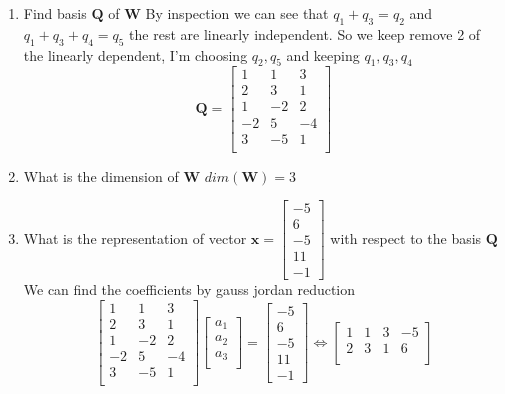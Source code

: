 \documentclass{article}
\begin{document}
\begin{enumerate}[1.]
\item Find basis $\mathbf{Q}$ of $\mathbf{W}$
\newline
By inspection we can see that $q_1 + q_3 = q_2$ and $q_1 + q_3 + q_4 = q_5 $ the rest are linearly independent.
So we keep remove 2 of the linearly dependent, I'm choosing $q_2, q_5$ and keeping $q_1,q_3,q_4$
$$
\mathbf{Q}
=
\begin{bmatrix}
1  & 1  & 3  \\
2  & 3  & 1  \\
1  & -2 & 2  \\
-2 & 5  & -4 \\
3  & -5 & 1  \\
\end{bmatrix}
$$
\item What is the dimension of $\mathbf{W}$
\newline
$dim(\mathbf{W}) = 3$
\item What is the representation of vector $\mathbf{x} = \begin{bmatrix}-5 \\ 6 \\ -5 \\ 11 \\ -1 \end{bmatrix}$ with respect to the basis $\mathbf{Q}$
\newline
We can find the coefficients by gauss jordan reduction
$$
\begin{bmatrix}
1  & 1  & 3  \\
2  & 3  & 1  \\
1  & -2 & 2  \\
-2 & 5  & -4 \\
3  & -5 & 1  \\
\end{bmatrix}
\begin{bmatrix}
a_1 \\
a_2 \\
a_3 \\
\end{bmatrix}
=
\begin{bmatrix}
-5 \\
6  \\
-5 \\
11 \\
-1
\end{bmatrix}
\Leftrightarrow
\begin{bmatrix}
1  & 1  & 3  & -5 \\
2  & 3  & 1  & 6  \\

\end{bmatrix}$$
\end{enumerate}
\end{document}
